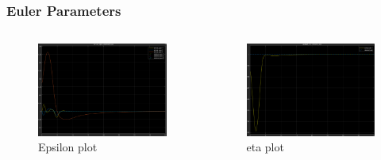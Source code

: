 \documentclass{beamer}
\begin{document}
\begin{frame}
    \frametitle{Euler Parameters}

    \begin{columns}

        \begin{figure}[h]
            \centering
            \includegraphics[width=1\textwidth]{epsilon.png}
            \caption{Epsilon plot}
            \label{fig:epsilon}
        \end{figure}

        \begin{figure}[h]
            \centering
            \includegraphics[width=1\textwidth]{eta.png}
            \caption{eta plot}
            \label{fig:eta}
        \end{figure}
    \end{columns}
\end{frame}
\end{document}
